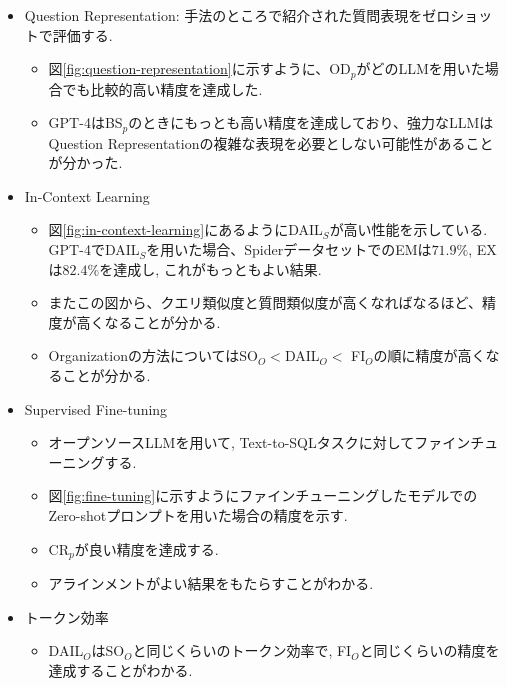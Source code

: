 \documentclass[dvipdfmx,uplatex]{jsarticle}
\theoremstyle{remark}
\newenvironment{experiment}[1]{
    \begin{tcolorbox}[
        colframe=violet,
        colback=violet!10!white,
        colbacktitle=violet!40!white,
        coltitle=black,
        fonttitle=\bfseries,
        title={#1}
    ]
}{
    \end{tcolorbox}
}
\begin{document}
\begin{experiment}{実験結果}
\begin{itemize}
    \item Question Representation: 手法のところで紹介された質問表現をゼロショットで評価する.
    \begin{itemize}
        \item 図\ref{fig:question-representation}に示すように、OD${}_p$がどのLLMを用いた場合でも比較的高い精度を達成した.
        \item GPT-4はBS${}_p$のときにもっとも高い精度を達成しており、強力なLLMはQuestion Representationの複雑な表現を必要としない可能性があることが分かった.
    \end{itemize}
    \item In-Context Learning
    \begin{itemize}
        \item 図\ref{fig:in-context-learning}にあるようにDAIL${}_S$が高い性能を示している. GPT-4でDAIL${}_S$を用いた場合、SpiderデータセットでのEMは$71.9\%$, EXは$82.4\%$を達成し, これがもっともよい結果.
        \item またこの図から、クエリ類似度と質問類似度が高くなればなるほど、精度が高くなることが分かる.
        \item Organizationの方法についてはSO${}_O <$DAIL${}_O <$ FI${}_O$の順に精度が高くなることが分かる.
    \end{itemize} 
    \item Supervised Fine-tuning
    \begin{itemize}
        \item オープンソースLLMを用いて, Text-to-SQLタスクに対してファインチューニングする.
        \item 図\ref{fig:fine-tuning}に示すようにファインチューニングしたモデルでのZero-shotプロンプトを用いた場合の精度を示す.
        \item CR${}_p$が良い精度を達成する.
        \item アラインメントがよい結果をもたらすことがわかる.
    \end{itemize}
    \item トークン効率
    \begin{itemize}
        \item DAIL${}_O$はSO${}_O$と同じくらいのトークン効率で, FI${}_O$と同じくらいの精度を達成することがわかる.
    \end{itemize}
\end{itemize}
\end{experiment}
\end{document}

